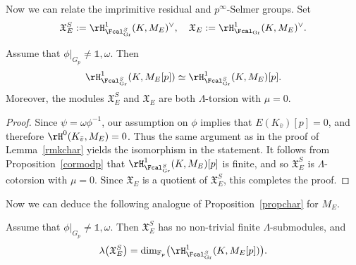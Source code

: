 Now we can relate the imprimitive residual and $p^\infty$-Selmer groups. Set
\[
\mathfrak{X}_{E}^S:=\rH^1_{\Fcal_{\rm Gr}^S}(K,M_E)^{\vee}, \quad \mathfrak{X}_{E}:=\rH^1_{\Fcal_{\rm Gr}}(K,M_E)^{\vee}.
\]

\begin{prop}
\notready\label{propmodp}
Assume that $\phi\vert_{G_{p}}\neq\mathds{1},\omega$. Then
\[
\rH^1_{\Fcal_{\rm Gr}^S}(K,M_E[p]) \simeq \rH^1_{\Fcal_{\rm Gr}^S}(K,M_E)[p].
\]
Moreover, the modules $\mathfrak{X}_E^S$ and $\mathfrak{X}_E$ are both $\Lambda$-torsion with $\mu=0$.
\end{prop}

\begin{proof}
Since $\psi=\omega\phi^{-1}$, our assumption on $\phi$ implies that $E(K_{\bar{v}})[p]=0$, and therefore $\rH^0(K_{\bar{v}},M_E)=0$. Thus the same argument as in the proof of Lemma~\ref{rmkchar} yields the  isomorphism in the statement. It follows from Proposition~\ref{cormodp} that $\rH^1_{\Fcal_{\rm Gr}^S}(K,M_E)[p]$ is finite, and so $\mathfrak{X}_E^S$ is $\Lambda$-cotorsion with $\mu=0$. Since $\mathfrak{X}_E$ is a quotient of $\mathfrak{X}_E^S$, this completes the proof.
\end{proof}

Now we can deduce the following analogue of Proposition~\ref{propchar} for $M_E$.

\begin{cor}
\notready\label{prop426}
Assume that $\phi\vert_{G_{p}}\neq\mathds{1},\omega$. Then $\mathfrak{X}_E^S$ has no non-trivial finite $\Lambda$-submodules, and
\[
\lambda\bigl(\mathfrak{X}_E^S\bigr)=\mathrm{dim}_{\mathbb{F}_p}\bigl(\rH^1_{\Fcal_{\rm Gr}^S}(K,M_E[p])\bigr).
\]
\end{cor}

